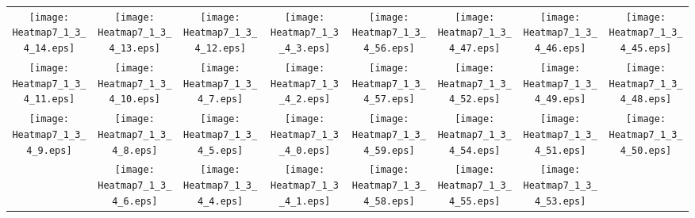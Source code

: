 \documentclass{standalone}
\begin{document}
\begin{tabular}{ *8{c} }
\texttt{[image: Heatmap7\_1\_3\_4\_14.eps]} & \texttt{[image: Heatmap7\_1\_3\_4\_13.eps]} & \texttt{[image: Heatmap7\_1\_3\_4\_12.eps]} & \texttt{[image: Heatmap7\_1\_3\_4\_3.eps]} & \texttt{[image: Heatmap7\_1\_3\_4\_56.eps]} & \texttt{[image: Heatmap7\_1\_3\_4\_47.eps]} & \texttt{[image: Heatmap7\_1\_3\_4\_46.eps]} & \texttt{[image: Heatmap7\_1\_3\_4\_45.eps]} \\
\texttt{[image: Heatmap7\_1\_3\_4\_11.eps]} & \texttt{[image: Heatmap7\_1\_3\_4\_10.eps]} & \texttt{[image: Heatmap7\_1\_3\_4\_7.eps]} & \texttt{[image: Heatmap7\_1\_3\_4\_2.eps]} & \texttt{[image: Heatmap7\_1\_3\_4\_57.eps]} & \texttt{[image: Heatmap7\_1\_3\_4\_52.eps]} & \texttt{[image: Heatmap7\_1\_3\_4\_49.eps]} & \texttt{[image: Heatmap7\_1\_3\_4\_48.eps]} \\
\texttt{[image: Heatmap7\_1\_3\_4\_9.eps]} & \texttt{[image: Heatmap7\_1\_3\_4\_8.eps]} & \texttt{[image: Heatmap7\_1\_3\_4\_5.eps]} & \texttt{[image: Heatmap7\_1\_3\_4\_0.eps]} & \texttt{[image: Heatmap7\_1\_3\_4\_59.eps]} & \texttt{[image: Heatmap7\_1\_3\_4\_54.eps]} & \texttt{[image: Heatmap7\_1\_3\_4\_51.eps]} & \texttt{[image: Heatmap7\_1\_3\_4\_50.eps]} \\
 & \texttt{[image: Heatmap7\_1\_3\_4\_6.eps]} & \texttt{[image: Heatmap7\_1\_3\_4\_4.eps]} & \texttt{[image: Heatmap7\_1\_3\_4\_1.eps]} & \texttt{[image: Heatmap7\_1\_3\_4\_58.eps]} & \texttt{[image: Heatmap7\_1\_3\_4\_55.eps]} & \texttt{[image: Heatmap7\_1\_3\_4\_53.eps]} &  
\end{tabular}
\end{document}
